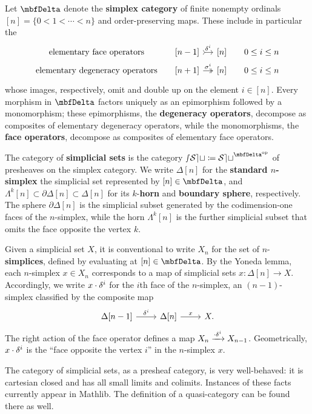 \begin{ntn}\label{ntn:simplex-cat} Let $\Del$ denote the \textbf{simplex category} of finite nonempty ordinals $[n] = \{0 <1 <\cdots < n\}$ and order-preserving maps. These include in particular the
\[
\begin{tikzcd}[row sep=tiny, column sep=small]
\text{elementary~face~operators} & {[n-1]} \arrow[r, tail, "{\face^i}"] & {[n]}  & {0 \leq i \leq n}  \\
\text{elementary~degeneracy~operators} & {[n+1]} \arrow[r, two heads, "{\degen^i}"] & {[n]} & {0 \leq i \leq n }
\end{tikzcd}
\]
whose images, respectively, omit and double up on the element $i \in [n]$. Every morphism in $\Del$ factors uniquely as an epimorphism followed by a monomorphism; these epimorphisms, the \textbf{degeneracy operators}, decompose as composites of elementary degeneracy operators, while the monomorphisms, the \textbf{face operators}, decompose as composites of elementary face operators.

The category of \textbf{simplicial sets} is the category $\sSet \coloneq \Set^{\Del\op}$ of pre\-sheaves on the simplex category. We write $\Delta[n]$ for the \textbf{standard $n$-simplex} the simplicial set represented by $[n] \in \Del$, and $\Lambda^k[n]\subset\partial\Delta[n] \subset \Delta[n]$ for its $k$-\textbf{horn} and \textbf{boundary sphere}, respectively. The sphere $\partial\Delta[n]$ is the simplicial subset generated by the codimension-one faces of the $n$-simplex, while the horn $\Lambda^k[n]$ is the further simplicial subset that omits the face opposite the vertex $k$.

Given a simplicial set $X$, it is conventional to write $X_n$ for the set of $n$-\textbf{sim\-plices}, defined by evaluating at $[n] \in \Del$. By the Yoneda lemma, each $n$-simplex $x \in X_n$ corresponds to a map of simplicial sets $x \colon \Delta[n] \to X$. Accordingly, we write $x \cdot \delta^i$ for the $i$th face of the $n$-simplex, an $(n-1)$-simplex classified by the composite map
\[
\begin{tikzcd}
\Delta[n-1] \arrow[r, "\face^i"] & \Delta[n] \arrow[r, "x"] & X.
\end{tikzcd}
\] The right action of the face operator defines a map $X_n \xrightarrow{\cdot\delta^i} X_{n-1}$. Geometrically, $x\cdot \delta^i$ is the ``face opposite the vertex $i$'' in the $n$-simplex $x$.
\end{ntn}

The category of simplicial sets, as a presheaf category, is very well-behaved: it is cartesian closed and has all small limits and colimits. Instances of these facts currently appear in Mathlib. The definition of a quasi-category can be found there as well.


